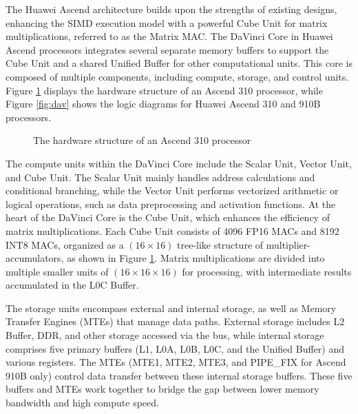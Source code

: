 The Huawei Ascend architecture builds upon the strengths of existing designs, enhancing the SIMD execution model with a powerful Cube Unit for matrix multiplications, referred to as the Matrix MAC. The DaVinci Core in Huawei Ascend processors integrates several separate memory buffers to support the Cube Unit and a shared Unified Buffer for other computational units. This core is composed of multiple components, including compute, storage, and control units. Figure \ref{fig:a310} displays the hardware structure of an Ascend 310 processor, while Figure \ref{fig:dav} shows the logic diagrams for Huawei Ascend 310 and 910B processors.

\begin{figure}[tb]
    \caption{The hardware structure of an Ascend 310 processor}
    \label{fig:a310}
    \end{figure}

The compute units within the DaVinci Core include the Scalar Unit, Vector Unit, and Cube Unit. The Scalar Unit mainly handles address calculations and conditional branching, while the Vector Unit performs vectorized arithmetic or logical operations, such as data preprocessing and activation functions. At the heart of the DaVinci Core is the Cube Unit, which enhances the efficiency of matrix multiplications. Each Cube Unit consists of 4096 FP16 MACs and 8192 INT8 MACs, organized as a $(16 \times 16)$ tree-like structure of multiplier-accumulators, as shown in Figure \ref{fig:a310}. Matrix multiplications are divided into multiple smaller units of $(16 \times 16 \times 16)$ for processing, with intermediate results accumulated in the L0C Buffer.

The storage units encompass external and internal storage, as well as Memory Transfer Engines (MTEs) that manage data paths. External storage includes L2 Buffer, DDR, and other storage accessed via the bus, while internal storage comprises five primary buffers (L1, L0A, L0B, L0C, and the Unified Buffer) and various registers. The MTEs (MTE1, MTE2, MTE3, and PIPE\_FIX for Ascend 910B only) control data transfer between these internal storage buffers. These five buffers and MTEs work together to bridge the gap between lower memory bandwidth and high compute speed.
        
